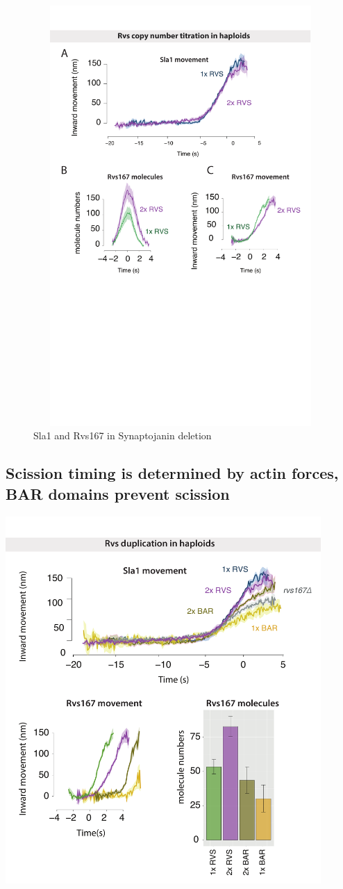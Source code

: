 		\begin{figure}
		\centering
		\includegraphics[width=16cm,height=16cm,keepaspectratio]{figures/results_final/rvs_haploid}
		\caption{Sla1 and Rvs167 in Synaptojanin deletion \label{fig5}}
		\end{figure}	
	
	\subsection{Scission timing is determined by actin forces, \\
		BAR domains prevent scission}
	
	\includegraphics[width=12cm,height=12 cm,keepaspectratio]{figures/results_final/scaffolding}